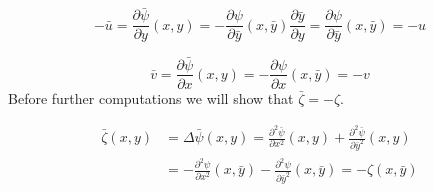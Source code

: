 \begin{equation}
-\bar u=\frac{\partial \bar{\psi}}{\partial y}(x,y)=-\frac{\partial \psi}{\partial \bar y}(x,\bar y)\frac{\partial \bar{y}}{\partial y}=\frac{\partial \psi}{\partial \bar y}(x,\bar y)=-u
\label{eq:ubar}
\end{equation}

\begin{equation}
\bar v=\frac{\partial \bar{\psi}}{\partial x}(x,y)=-\frac{\partial \psi}{\partial x}(x,\bar y)=-v \label{eq:vbar}
\end{equation}
Before further computations we will show that $\bar{\zeta}=-\zeta$.

\begin{align}
\bar{\zeta}(x,y) &= \Delta \bar{\psi}(x,y)
=\frac{\partial^2\bar{\psi}}{\partial x^2}(x, y)+\frac{\partial^2\bar{\psi}}{\partial \bar y^2}(x, y) \nonumber \\
&=-\frac{\partial^2\psi}{\partial x^2}(x,\bar y)-\frac{\partial^2\psi}{\partial \bar y^2}(x,\bar y)
=-\zeta(x,\bar y)\label{eq:zetabar}
\end{align}

